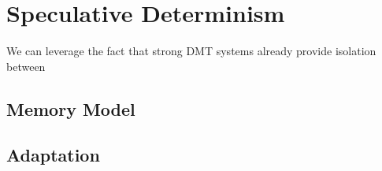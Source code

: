 
\section{Speculative Determinism}

We can leverage the fact that strong DMT systems already provide isolation between 

%
%
%



\subsection{Memory Model}

\subsection{Adaptation}